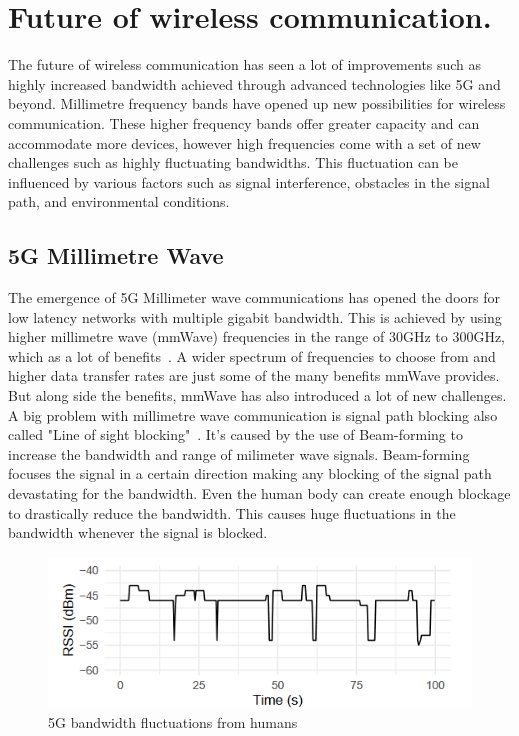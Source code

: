 \documentclass[a4paper,english, 11pt]{report}
\begin{document}
\section{Future of wireless communication.}
The future of wireless communication has seen a lot of improvements such as highly increased bandwidth achieved through advanced technologies like 5G and beyond. Millimetre frequency bands have opened up new possibilities for wireless communication. These higher frequency bands offer greater capacity and can accommodate more devices, however high frequencies come with a set of new challenges such as highly fluctuating bandwidths. This fluctuation can be influenced by various factors such as signal interference, obstacles in the signal path, and environmental conditions.

\subsection{5G Millimetre Wave}
The emergence of 5G Millimeter wave communications has opened the doors for low latency networks with multiple gigabit bandwidth. This is achieved by using higher millimetre wave (mmWave) frequencies in the range of 30GHz to 300GHz, which as a lot of benefits~\cite{Agrawal_Sharma_2016}. A wider spectrum of frequencies to choose from and higher data transfer rates are just some of the many benefits mmWave provides. But along side the benefits, mmWave has also introduced a lot of new challenges.\\

A big problem with millimetre wave communication is signal path blocking also called "Line of sight blocking"~\cite{mmwave_blocking}. It's caused by the use of Beam-forming to increase the bandwidth and range of milimeter wave signals. Beam-forming focuses the signal in a certain direction making any blocking of the signal path devastating for the bandwidth. Even the human body can create enough blockage to drastically reduce the bandwidth. This causes huge fluctuations in the bandwidth whenever the signal is blocked.\\
\begin{figure} %
	\centering
	\includegraphics[scale=1.25]{../diagrams/graphs/tcp_mmwave_blockage.png}
  	\caption{5G bandwidth fluctuations from humans}
  	\label{fig:blockage}
\end{figure}
\end{document}
